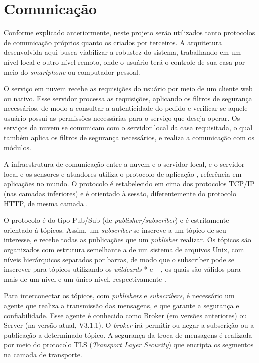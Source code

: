 \section{Comunicação}
Conforme explicado anteriormente, neste projeto serão utilizados tanto protocolos de comunicação próprios quanto os criados por terceiros. A arquitetura desenvolvida aqui busca viabilizar a robustez do sistema, trabalhando em um nível local e outro nível remoto, onde o usuário terá o controle de sua casa por meio do \textit{smartphone} ou computador pessoal.

O serviço em nuvem recebe as requisições do usuário por meio de um cliente web ou nativo. Esse servidor processa as requisições, aplicando os filtros de segurança necessários, de modo a consultar a autenticidade do pedido e verificar se aquele usuário possui as permissões necessárias para o serviço que deseja operar. Os serviços da nuvem se comunicam com o servidor local da casa requisitada, o qual também aplica os filtros de segurança necessários, e realiza a comunicação com os módulos.

A infraestrutura de comunicação entre a nuvem e o servidor local, e o servidor local e os sensores e atuadores utiliza o protocolo de aplicação \wmqtt{}, referência em aplicações \wiot{} no mundo. O protocolo \wmqtt{} é estabelecido em cima dos protocolos TCP/IP (nas camadas inferiores) e é orientado à sessão, diferentemente do protocolo HTTP, de mesma camada \cite{ibmMqtt}.

O protocolo \wmqtt{} é do tipo Pub/Sub (de \textit{publisher/subscriber}) e é estritamente orientado à tópicos. Assim, um \textit{subscriber} se inscreve a um tópico de seu interesse, e recebe todas as publicações que um \textit{publisher} realizar. Os tópicos são organizados com estrutura semelhante a de um sistema de arquivos Unix, com níveis hierárquicos separados por barras, de modo que o subscriber pode se inscrever para tópicos utilizando os \textit{wildcards} * e +, os quais são válidos para mais de um nível e um único nível, respectivamente \cite{mqttDocumentation}.

Para interconectar os tópicos, com \textit{publishers} e \textit{subscribers}, é necessário um agente que realiza a transmissão das mensagens, e que garante a segurança e confiabilidade. Esse agente é conhecido como Broker (em versões anteriores) ou Server (na versão atual, V3.1.1). O \textit{broker} irá permitir ou negar a subscrição ou a publicação a determinado tópico. A segurança da troca de mensagens é realizada por meio do protocolo TLS (\textit{Transport Layer Security}) que encripta os segmentos na camada de transporte.

